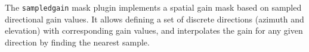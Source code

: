 The \texttt{sampledgain} mask plugin implements a spatial gain mask based on sampled directional gain values. It allows defining a set of discrete directions (azimuth and elevation) with corresponding gain values, and interpolates the gain for any given direction by finding the nearest sample.




